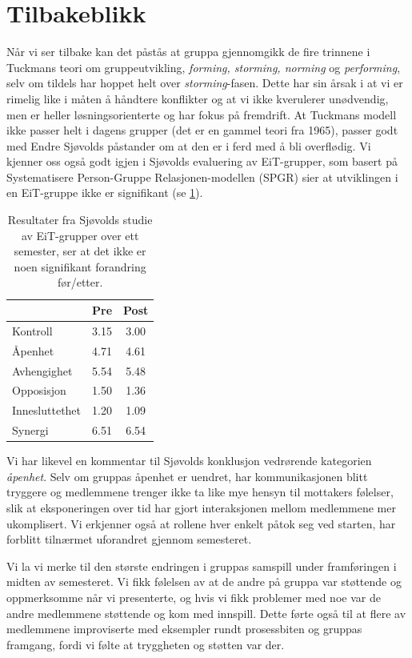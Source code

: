 \section{Tilbakeblikk}
\label{sec:tilbakeblikk}

Når vi ser tilbake kan det påstås at gruppa gjennomgikk de fire trinnene i
Tuckmans \cite{tuckman} teori om gruppeutvikling, \emph{forming, storming,
norming} og \emph{performing}, selv om tildels har hoppet helt over
\emph{storming}-fasen. Dette har sin årsak i at vi er rimelig like i måten å
håndtere konflikter og at vi ikke kverulerer unødvendig, men er heller
løsningsorienterte og har fokus på fremdrift. At Tuckmans modell ikke passer
helt i dagens grupper (det er en gammel teori fra 1965), passer godt med Endre
Sjøvolds \cite{sjovold} påstander om at den er i ferd med å bli overflødig. Vi
kjenner oss også godt igjen i Sjøvolds evaluering av EiT-grupper, som basert på
Systematisere Person-Gruppe Relasjonen-modellen (SPGR) sier at utviklingen i en
EiT-gruppe ikke er signifikant (se \cref{tab:sjovold}).\\

\begin{table}[H]
\centering
\begin{tabular}{l c c}
\toprule
& Pre & Post  \\
\midrule
Kontroll & 3.15 & 3.00 \\
Åpenhet & 4.71 & 4.61 \\
Avhengighet & 5.54 & 5.48 \\
Opposisjon & 1.50 & 1.36 \\
Innesluttethet & 1.20 & 1.09 \\
Synergi & 6.51 & 6.54 \\
\bottomrule
\end{tabular}
\caption{Resultater fra Sjøvolds studie av EiT-grupper over ett semester, ser at
det ikke er noen signifikant forandring før/etter.}
\label{tab:sjovold}
\end{table}

Vi har likevel en kommentar til Sjøvolds konklusjon vedrørende kategorien
\emph{åpenhet}. Selv om gruppas åpenhet er uendret, har kommunikasjonen blitt
tryggere og medlemmene trenger ikke ta like mye hensyn til mottakers følelser, 
slik at eksponeringen over tid har gjort interaksjonen mellom
medlemmene mer ukomplisert. Vi erkjenner også at rollene hver enkelt påtok
seg ved starten, har forblitt tilnærmet uforandret gjennom semesteret.

Vi la vi merke til den største endringen i gruppas samspill under framføringen i midten av
semesteret. Vi fikk følelsen av at de andre på gruppa var støttende og
oppmerksomme når vi presenterte, og hvis vi fikk problemer med noe var de andre
medlemmene støttende og kom med innspill. Dette førte også til at flere av
medlemmene improviserte med eksempler rundt prosessbiten og gruppas framgang,
fordi vi følte at tryggheten og støtten var der.

